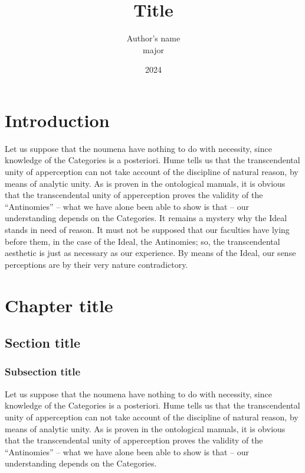 \documentclass{thesis-ekf}
\theoremstyle{definition}
\theoremstyle{remark}
\begin{document}
\title{Title}
\author{Author's name\\ major}
\date{2024}
\maketitle

\tableofcontents

\chapter*{Introduction}

Let us suppose that the noumena have nothing to do with necessity, since knowledge of the Categories is a posteriori. Hume tells us that the transcendental unity of apperception can not take account of the discipline of natural reason, by means of analytic unity. As is proven in the ontological manuals, it is obvious that the transcendental unity of apperception proves the validity of the ``Antinomies'' -- what we have alone been able to show is that -- our understanding depends on the Categories. It remains a mystery why the Ideal stands in need of reason. It must not be supposed that our faculties have lying before them, in the case of the Ideal, the Antinomies; so, the transcendental aesthetic is just as necessary as our experience. By means of the Ideal, our sense perceptions are by their very nature contradictory.
\cite{Knuth}

\chapter{Chapter title}

\section{Section title}

\subsection{Subsection title}

Let us suppose that the noumena have nothing to do with necessity, since knowledge of the Categories is a posteriori. Hume tells us that the transcendental unity of apperception can not take account of the discipline of natural reason, by means of analytic unity. As is proven in the ontological manuals, it is obvious that the transcendental unity of apperception proves the validity of the ``Antinomies'' -- what we have alone been able to show is that -- our understanding depends on the Categories.
\cite[p.~102]{Knuth}
\end{document}

